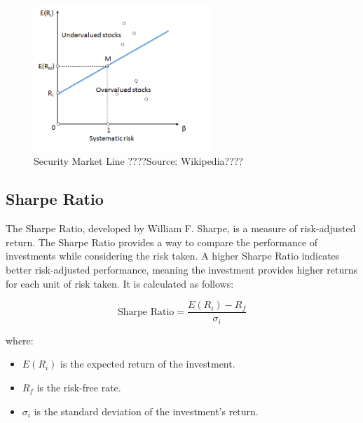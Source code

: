 \begin{figure}[!ht]
    \centering
    \includegraphics[width=0.6\textwidth]{../Figures/SML.png}
    \caption{Security Market Line ????Source: Wikipedia????}
    \label{fig:SML}

\end{figure}




\subsection{Sharpe Ratio}
The Sharpe Ratio, developed by William F. Sharpe, is a measure of risk-adjusted return. The Sharpe Ratio provides a way to compare the performance of investments while considering the risk taken. A higher Sharpe Ratio indicates better risk-adjusted performance, meaning the investment provides higher returns for each unit of risk taken. It is calculated as follows:

\begin{equation}
\text{Sharpe Ratio} = \frac{E(R_i) - R_f}{\sigma_i}
\end{equation}

where:
\begin{itemize}
    \item $E(R_i)$ is the expected return of the investment.
    \item $R_f$ is the risk-free rate.
    \item $\sigma_i$ is the standard deviation of the investment's return.
\end{itemize}

